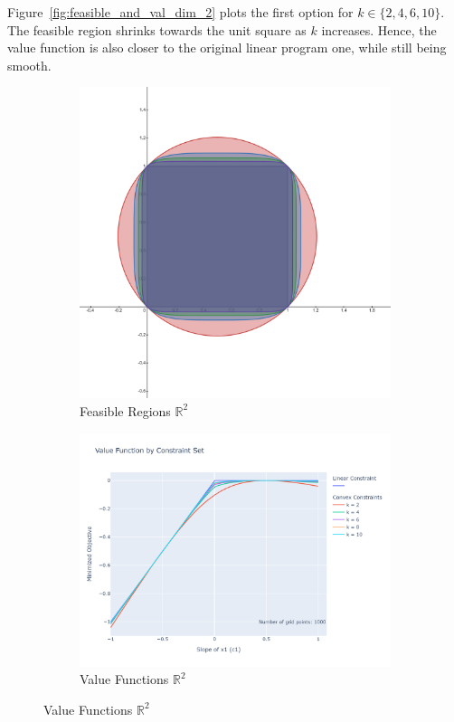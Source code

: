 \documentclass[11pt,a4paper,english]{article} %
\numberwithin{equation}{section}
\numberwithin{figure}{section}
\numberwithin{table}{section}
\theoremstyle{definition}
\theoremstyle{remark}
\begin{document}
Figure~\ref{fig:feasible_and_val_dim_2} plots the first option for $k\in\{2,4,6,10\}$.
The feasible region shrinks towards the unit square as $k$ increases.
Hence, the value function is also closer to the original linear program one, while still being smooth.

\begin{figure}
	\centering
	\caption{Feasible Regions and Value Functions in $\mathbb{R}^2$.}\label{fig:feasible_and_val_dim_2}

	\begin{subfigure}{0.75\textwidth}
		\includegraphics[width=\textwidth]{../figures/desmos_dim_2_v2.png}
		\caption{Feasible Regions $\mathbb{R}^2$}
	\end{subfigure}

	\begin{subfigure}{0.75\textwidth}
		\includegraphics[width=\textwidth]{../figures/value_function_by_constraint_set_dim_2.png}
		\caption{Value Functions $\mathbb{R}^2$}
	\end{subfigure}
\end{figure}
\end{document}
